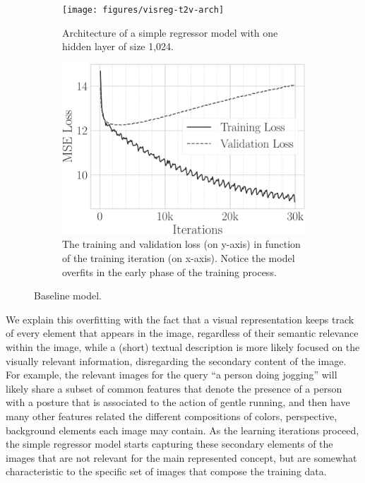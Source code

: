 \begin{figure}
\begin{subfigure}{0.46\textwidth}
\centering
\texttt{[image: figures/visreg-t2v-arch]}
\caption{Architecture of a simple regressor model with one hidden layer of size 1,024.}
\label{fig:t2v:visreg:arch}
\end{subfigure}
\hfill
\begin{subfigure}{0.5\textwidth}
\includegraphics[width=\linewidth]{visreg-loss}
\caption{The training and validation loss (on y-axis) in function of the training iteration (on x-axis).
Notice the model overfits in the early phase of the training process.}
\label{fig:t2v:visreg:loss}
\end{subfigure}
\caption{Baseline \visreg{} model.}
\label{fig:t2v:visreg}
\end{figure}

We explain this overfitting with the fact that a visual representation keeps track of every element that appears in the image, regardless of their semantic relevance within the image, while a (short) textual description is more likely focused on the visually relevant information, disregarding the secondary content of the image.
For example, the relevant images for the query ``a person doing jogging'' will likely share a subset of common features that denote the presence of a person with a posture that is associated to the action of gentle running, and then have many other features related the different compositions of colors, perspective, background elements each image may contain.
As the learning iterations proceed, the simple regressor model starts capturing these secondary elements of the images that are not relevant for the main represented concept, but are somewhat characteristic to the specific set of images that compose the training data.

